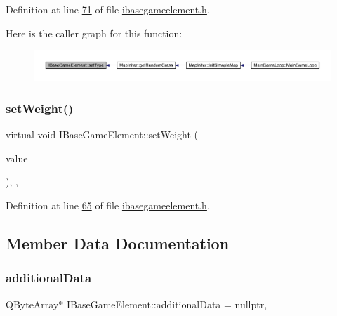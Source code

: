 Definition at line \hyperlink{a00047_source_l00071}{71} of file \hyperlink{a00047_source}{ibasegameelement.\+h}.

Here is the caller graph for this function\+:
\nopagebreak
\begin{figure}[H]
\begin{center}
\leavevmode
\includegraphics[width=350pt]{d2/df5/a00137_a324cba2176155a50b5a2239eb0a8b6a0_icgraph}
\end{center}
\end{figure}
\mbox{\label{a00137_a4b5e42aa7985c9bf959f0275cbc1bac7}} 
\subsubsection{\texorpdfstring{set\+Weight()}{setWeight()}}
{\footnotesize\ttfamily virtual void I\+Base\+Game\+Element\+::set\+Weight (\begin{DoxyParamCaption}\item[{\hyperlink{a00161}{Infinity\+Double} $\ast$}]{value }\end{DoxyParamCaption})\hspace{0.3cm}{\ttfamily [inline]}, {\ttfamily [virtual]}, {\ttfamily [inherited]}}



Definition at line \hyperlink{a00047_source_l00065}{65} of file \hyperlink{a00047_source}{ibasegameelement.\+h}.



\subsection{Member Data Documentation}
\mbox{\label{a00137_a4d3547697d3bd0c2d65c83b07b3f8f91}} 
\subsubsection{\texorpdfstring{additional\+Data}{additionalData}}
{\footnotesize\ttfamily Q\+Byte\+Array$\ast$ I\+Base\+Game\+Element\+::additional\+Data = nullptr\hspace{0.3cm}{\ttfamily [protected]}, {\ttfamily [inherited]}}



